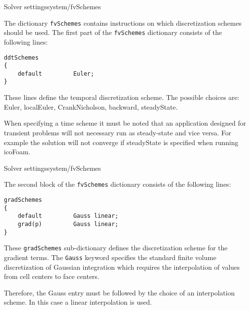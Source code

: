 \documentclass{beamer}
\begin{document}
\begin{frame}[fragile]{Solver settings}{system/fvSchemes}

The dictionary \texttt{fvSchemes} contains instructions on which discretization schemes should be used. The first part of the \texttt{fvSchemes} dictionary consists of the following lines:
\begin{small}
\begin{verbatim}
ddtSchemes
{
    default         Euler;
}
\end{verbatim}
\end{small}
These lines define the temporal discretization scheme. The possible choices are: Euler, localEuler, CrankNicholson, backward, steadyState.

\begin{block}

{\small When specifying a time scheme it must be noted that an application designed for transient problems will not necessary run as steady-state and vice versa. For example the solution will not converge if steadyState is specified when running icoFoam.}
\end{block}



\end{frame}

\begin{frame}[fragile]{Solver settings}{system/fvSchemes}

The second block of the \texttt{fvSchemes} dictionary consists of the following lines:
\begin{small}
\begin{verbatim}
gradSchemes
{
    default         Gauss linear;
    grad(p)         Gauss linear;
}
\end{verbatim}
\end{small}

These \texttt{gradSchemes} sub-dictionary defines the discretization scheme for the gradient terms. The \texttt{Gauss} keyword specifies the standard finite volume discretization of Gaussian integration which requires the interpolation of values from cell centers to face centers. 

Therefore, the Gauss entry must be followed by the choice of an interpolation scheme. In this case a linear interpolation is used.

\end{frame}
\end{document}
